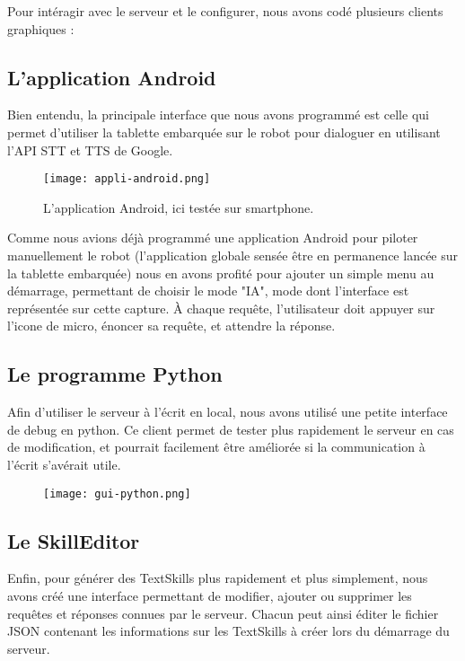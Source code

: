 \documentclass[a4paper,10pt]{report}
\begin{document}
        {Pour intéragir avec le serveur et le configurer, nous avons codé plusieurs clients graphiques :}
        \subsection{L'application Android}
          {Bien entendu, la principale interface que nous avons programmé est celle qui permet d'utiliser la tablette embarquée sur le robot pour dialoguer en utilisant l'API STT et TTS de Google.}
          \begin{figure}[h]
            \centering
            \texttt{[image: appli-android.png]}
            \caption{L'application Android, ici testée sur smartphone.}
          \end{figure}

          {Comme nous avions déjà programmé une application Android pour piloter manuellement le robot (l'application globale sensée être en permanence lancée sur la tablette embarquée) nous en avons profité pour ajouter un simple menu au démarrage, permettant de choisir le mode "IA", mode dont l'interface est représentée sur cette capture. À chaque requête, l'utilisateur doit appuyer sur l'icone de micro, énoncer sa requête, et attendre la réponse.}


        \subsection{Le programme Python}
          {Afin d'utiliser le serveur à l'écrit en local, nous avons utilisé une petite interface de debug en python. Ce client permet de tester plus rapidement le serveur en cas de modification, et pourrait facilement être améliorée si la communication à l'écrit s'avérait utile.}
          \begin{figure}[h]
            \texttt{[image: gui-python.png]}
            \centering
          \end{figure}

        \subsection{Le SkillEditor}
          {Enfin, pour générer des TextSkills plus rapidement et plus simplement, nous avons créé une interface permettant de modifier, ajouter ou supprimer les requêtes et réponses connues par le serveur. Chacun peut ainsi éditer le fichier JSON contenant les informations sur les TextSkills à créer lors du démarrage du serveur.}
          \begin{figure}[h]
            \noindent
            \centering
          \end{figure}
\end{document}
